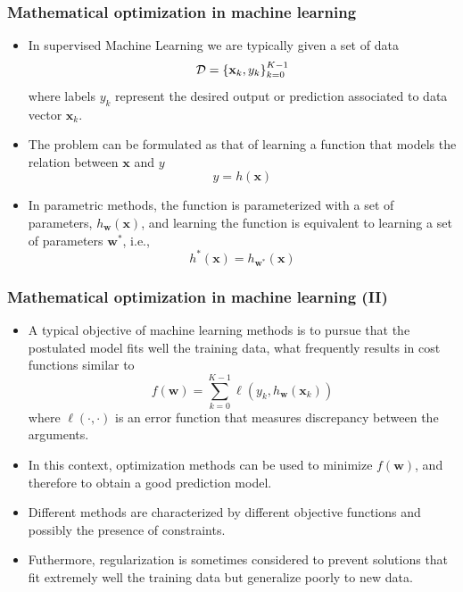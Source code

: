 \documentclass{beamer}
\newcommand{\xM}{{\mathbf x}}
\newcommand{\w}{{\mathbf w}}
\begin{document}
\begin{frame}

	\frametitle{Mathematical optimization in machine learning}
\begin{itemize}
\item In supervised Machine Learning we are typically given a set of data
$${\cal D} = \left\{{\xM_{k}, y_{k}}\right\}_{k=0}^{K-1}$$
where labels $y_k$ represent the desired output or prediction associated to data vector $\xM_k$.

\item The problem can be formulated as that of learning a function that models the relation between $\xM$ and $y$
$$y = h(\xM)$$

\item In parametric methods, the function is parameterized with a set of parameters, $h_\w(\xM)$, and learning the function is equivalent to learning a set of parameters $\w^\ast$, i.e.,
$$h^\ast (\xM) = h_{\w^\ast}(\xM)$$



\end{itemize}

\end{frame}

\begin{frame}

	\frametitle{Mathematical optimization in machine learning (II)}
\begin{itemize}
\item A typical objective of machine learning methods is to pursue that the postulated model fits well the training data, what frequently results in cost functions similar to
$$f(\w) = \sum_{k=0}^{K-1} \ell(y_k, h_\w(\xM_k))$$
where $\ell(\cdot, \cdot)$ is an error function that measures discrepancy between the arguments. 

\item In this context, optimization methods can be used to minimize $f(\w)$, and therefore to obtain a good prediction model.

\item Different methods are characterized by different objective functions and possibly the presence of constraints.

\item Futhermore, regularization is sometimes considered to prevent solutions that fit extremely well the training data but generalize poorly to new data.

\end{itemize}

\end{frame}
\end{document}
